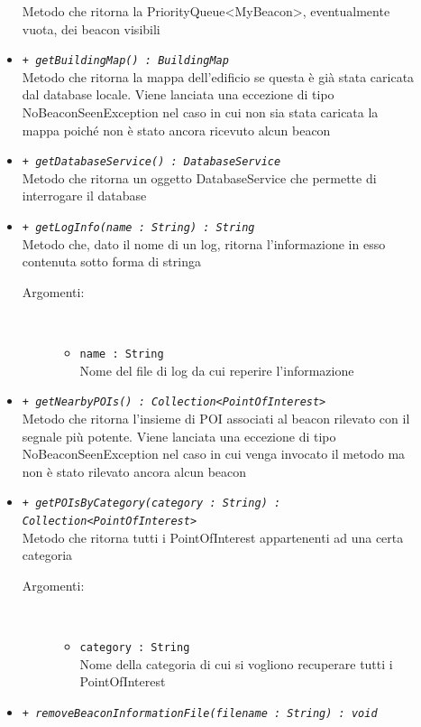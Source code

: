 \documentclass[../DefinizioneDiProdotto.tex]{subfiles}
\begin{document}
\begin{description}
\begin{itemize}
		Metodo che ritorna la PriorityQueue<MyBeacon>, eventualmente vuota, dei beacon visibili
		\item \texttt{+ \textit{getBuildingMap() : BuildingMap}}\\
		Metodo che ritorna la mappa dell'edificio se questa è già stata caricata dal database locale. Viene lanciata una eccezione di tipo NoBeaconSeenException nel caso in cui non sia stata caricata la mappa poiché non è stato ancora ricevuto alcun beacon
		\item \texttt{+ \textit{getDatabaseService() : DatabaseService}}\\
		Metodo che ritorna un oggetto DatabaseService che permette di interrogare il database
		\item \texttt{+ \textit{getLogInfo(name : String) : String}}\\
		Metodo che, dato il nome di un log, ritorna l'informazione in esso contenuta sotto forma di stringa
		\begin{description}
			\item[Argomenti:] \
			\begin{itemize}
				\item \texttt{name : String}\\
				Nome del file di log da cui reperire l'informazione\end{itemize}
		\end{description}
		\item \texttt{+ \textit{getNearbyPOIs() : Collection<PointOfInterest>}}\\
		Metodo che ritorna l'insieme di POI associati al beacon rilevato con il segnale più potente. Viene lanciata una eccezione di tipo NoBeaconSeenException nel caso in cui venga invocato il metodo ma non è stato rilevato ancora alcun beacon
		\item \texttt{+ \textit{getPOIsByCategory(category : String) : Collection<PointOfInterest>}}\\
		Metodo che ritorna tutti i PointOfInterest appartenenti ad una certa categoria
		\begin{description}
			\item[Argomenti:] \
			\begin{itemize}
				\item \texttt{category : String}\\
				Nome della categoria di cui si vogliono recuperare tutti i PointOfInterest\end{itemize}
		\end{description}
		\item \texttt{+ \textit{removeBeaconInformationFile(filename : String) : void}}\\

\end{itemize}
\end{description}
\end{document}
